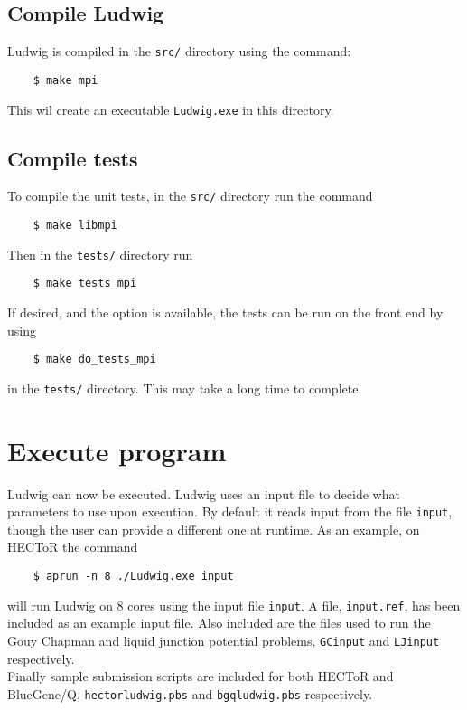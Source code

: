\documentclass[12pt,a4paper]{article}
\begin{document}
\subsection{Compile Ludwig}
  Ludwig is compiled in the \texttt{src/} directory using the command:
  \begin{verbatim}
    $ make mpi
  \end{verbatim}
  This wil create an executable \texttt{Ludwig.exe} in this directory.

\subsection{Compile tests}
  To compile the unit tests, in the \texttt{src/} directory run the command
  \begin{verbatim}
    $ make libmpi
  \end{verbatim}
  Then in the \texttt{tests/} directory run
  \begin{verbatim}
    $ make tests_mpi
  \end{verbatim}
  If desired, and the option is available, the tests can be run on the front end by using
  \begin{verbatim}
    $ make do_tests_mpi
  \end{verbatim}
  in the \texttt{tests/} directory. This may take a long time to complete.


\section{Execute program}
  Ludwig can now be executed.
  Ludwig uses an input file to decide what parameters to use upon execution.
  By default it reads input from the file \texttt{input}, though the user can provide a different one at runtime.
  As an example, on HECToR the command
  \begin{verbatim}
    $ aprun -n 8 ./Ludwig.exe input
  \end{verbatim}
  will run Ludwig on 8 cores using the input file \texttt{input}.
  A file, \texttt{input.ref}, has been included as an example input file.
  Also included are the files used to run the Gouy Chapman and liquid junction potential problems, \texttt{GCinput} and \texttt{LJinput} respectively.\\
  Finally sample submission scripts are included for both HECToR and BlueGene/Q, \texttt{hectorludwig.pbs} and \texttt{bgqludwig.pbs} respectively. 
\end{document}
